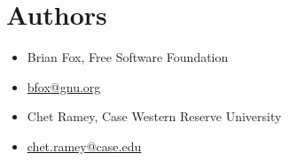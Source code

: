 \section{Authors}\label{authors}
    \begin{itemize}[leftmargin=0]
        \item[]  Brian Fox, Free Software Foundation 
        \item[]  \quad\url{bfox@gnu.org}
        \item[]  Chet Ramey, Case Western Reserve University 
        \item[]  \quad\url{chet.ramey@case.edu}
    \end{itemize}